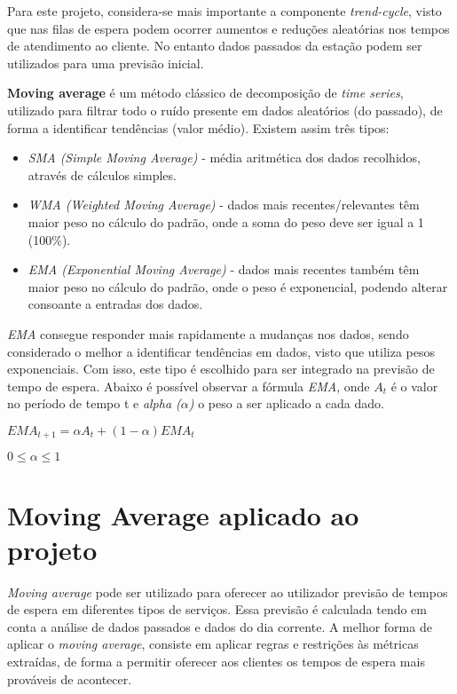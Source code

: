 Para este projeto, considera-se mais importante a componente \textit{trend-cycle}, visto que nas filas de espera podem ocorrer aumentos e reduções aleatórias nos tempos de atendimento ao cliente. No entanto dados passados da estação podem ser utilizados para uma previsão inicial.

\textbf{Moving average} \cite{movingaverageprocesses} é um método clássico de decomposição de \textit{time series}, utilizado para filtrar todo o ruído presente em dados aleatórios (do passado), de forma a identificar tendências (valor médio). Existem assim três tipos:

\begin{itemize}
	\item \textit{SMA (Simple Moving Average)} - média aritmética dos dados recolhidos, através de cálculos simples. 
	\item \textit{WMA (Weighted Moving Average)} - dados mais recentes/relevantes têm maior peso no cálculo do padrão, onde a soma do peso deve ser igual a 1 (100\%).
	\item \textit{EMA (Exponential Moving Average)} - dados mais recentes também têm maior peso no cálculo do padrão, onde o peso é exponencial, podendo alterar consoante a entradas dos dados.
\end{itemize}

\textit{EMA} consegue responder mais rapidamente a mudanças nos dados, sendo considerado o melhor a identificar tendências em dados, visto que utiliza pesos exponenciais. Com isso, este tipo é escolhido para ser integrado na previsão de tempo de espera. Abaixo é possível observar a fórmula \textit{EMA}, onde $A_{t}$ é o valor no período de tempo t e \textit{alpha ($\alpha$)} o peso a ser aplicado a cada dado.

\begin{center}
$EMA_{t+1} = \alpha A_{t} + (1 - \alpha) EMA_{t}$

$0 \leq \alpha \leq 1$
\end{center}

\section{Moving Average aplicado ao projeto}
\label{sec:movingaveragesapplied}

\textit{Moving average} pode ser utilizado para oferecer ao utilizador previsão de tempos de espera em diferentes tipos de serviços.
Essa previsão é calculada tendo em conta a análise de dados passados e dados do dia corrente. A melhor forma de aplicar o \textit{moving average}, consiste em aplicar regras e restrições às métricas extraídas, de forma a permitir oferecer aos clientes os tempos de espera mais prováveis de acontecer.

